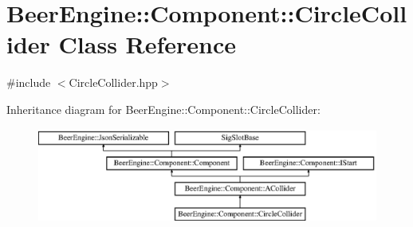 \hypertarget{class_beer_engine_1_1_component_1_1_circle_collider}{}\section{Beer\+Engine\+:\+:Component\+:\+:Circle\+Collider Class Reference}
\label{class_beer_engine_1_1_component_1_1_circle_collider}


{\ttfamily \#include $<$Circle\+Collider.\+hpp$>$}

Inheritance diagram for Beer\+Engine\+:\+:Component\+:\+:Circle\+Collider\+:\begin{figure}[H]
\begin{center}
\leavevmode
\includegraphics[height=3.124128cm]{class_beer_engine_1_1_component_1_1_circle_collider}
\end{center}
\end{figure}
